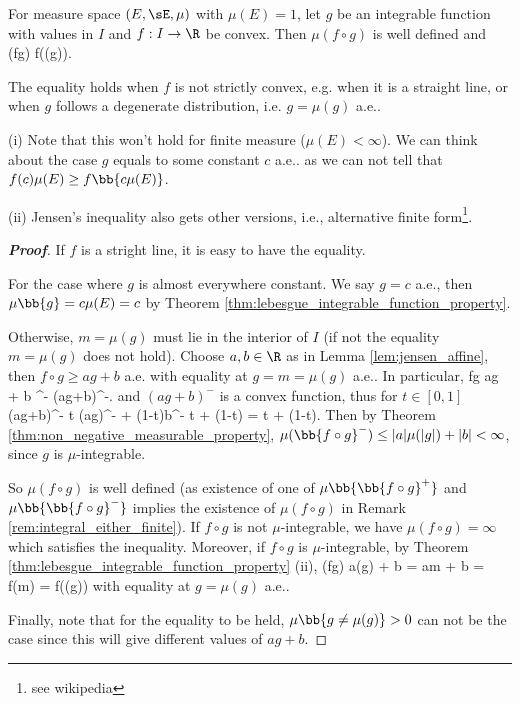 \begin{theorem}\label{thm:jensen_inequality_measure}
For measure space $(E,\sE,\mu)$ with $\mu(E) =1$, let $g$ be an integrable function with values in $I$ and $f : I \to \R$ be convex. Then $\mu(f\circ g)$ is well defined and
\be
\mu(f\circ g) \geq f(\mu(g)).
\ee

The equality holds when $f$ is not strictly convex, e.g. when it is a straight line, or when $g$ follows a degenerate distribution, i.e. $g = \mu(g)$ a.e..
\end{theorem}

\begin{remark}
\ben
\item [(i)] Note that this won't hold for finite measure ($\mu(E)< \infty$). We can think about the case $g$ equals to some constant $c$ a.e.. as we can not tell that $f(c)\mu(E) \geq f\bb{c\mu(E)}$.

\item [(ii)] Jensen's inequality also gets other versions, i.e., alternative finite form\footnote{see wikipedia}.
\een
\end{remark}

\begin{proof}[\bf Proof]
If $f$ is a stright line, it is easy to have the equality.

For the case where $g$ is almost everywhere constant. We say $g=c$ a.e., then $\mu\bb{g}=c\mu(E) =c$ by Theorem \ref{thm:lebesgue_integrable_function_property}.

Otherwise, $m = \mu(g)$ must lie in the interior of $I$ (if not the equality $m = \mu(g)$ does not hold). Choose $a, b \in \R$ as in Lemma \ref{lem:jensen_affine}, then $f\circ g \geq ag + b$ a.e. with equality at $g = m = \mu(g)$ a.e.. In particular,
\be
f\circ g \geq ag + b \quad\ra\quad {}^- \leq (ag+b)^-.
\ee
and $(ag+b)^-$ is a convex function, thus for $t\in [0,1]$
\be
(ag+b)^- \leq t (ag)^- + (1-t)b^- \leq t + (1-t) = t  + (1-t).
\ee
Then by Theorem \ref{thm:non_negative_measurable_property}, $\mu(\bb{f\circ g}^-) \leq |a|\mu(|g|) + |b| < \infty$, since $g$ is $\mu$-integrable.

So $\mu(f\circ g)$ is well defined (as existence of one of $\mu\bb{\bb{f\circ g}^+}$ and $\mu\bb{\bb{f\circ g}^-}$ implies the existence of $\mu(f\circ g)$ in Remark \ref{rem:integral_either_finite}). If $f\circ g$ is not $\mu$-integrable, we have $\mu(f\circ g) = \infty$ which satisfies the inequality. Moreover, if $f\circ g$ is $\mu$-integrable, by Theorem \ref{thm:lebesgue_integrable_function_property} (ii),
\be
\mu(f\circ g) \geq a\mu(g) + b = am + b = f(m) = f(\mu(g))
\ee
with equality at $g = \mu(g)$ a.e..

Finally, note that for the equality to be held, $\mu\bb{g \neq \mu(g)} >0$ can not be the case since this will give different values of $ag +b$.
\end{proof}

